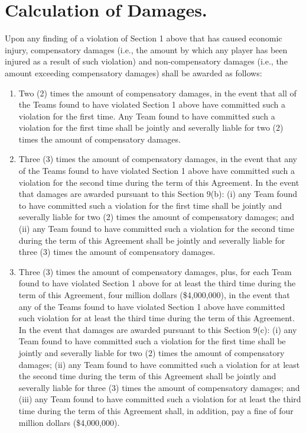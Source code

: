 \documentclass[
]{book}
\providecommand{\tightlist}{%
  \setlength{\itemsep}{0pt}\setlength{\parskip}{0pt}}
\begin{document}
\hypertarget{calculation-of-damages.}{%
\section{Calculation of Damages.}\label{calculation-of-damages.}}

Upon any finding of a violation of Section 1 above that has caused economic injury, compensatory damages (i.e., the amount by which any player has been injured as a result of such violation) and non-compensatory damages (i.e., the amount exceeding compensatory damages) shall be awarded as follows:

\begin{enumerate}
\def\labelenumi{(\alph{enumi})}
\tightlist
\item
  Two (2) times the amount of compensatory damages, in the event that all of the Teams found to have violated Section 1 above have committed such a violation for the first time. Any Team found to have committed such a violation for the first time shall be jointly and severally liable for two (2) times the amount of compensatory damages.
\item
  Three (3) times the amount of compensatory damages, in the event that any of the Teams found to have violated Section 1 above have committed such a violation for the second time during the term of this Agreement. In the event that damages are awarded pursuant to this Section 9(b): (i) any Team found to have committed such a violation for the first time shall be jointly and severally liable for two (2) times the amount of compensatory damages; and (ii) any Team found to have committed such a violation for the second time during the term of this Agreement shall be jointly and severally liable for three (3) times the amount of compensatory damages.
\item
  Three (3) times the amount of compensatory damages, plus, for each Team found to have violated Section 1 above for at least the third time during the term of this Agreement, four million dollars (\$4,000,000), in the event that any of the Teams found to have violated Section 1 above have committed such violation for at least the third time during the term of this Agreement. In the event that damages are awarded pursuant to this Section 9(c): (i) any Team found to have committed such a violation for the first time shall be jointly and severally liable for two (2) times the amount of compensatory damages; (ii) any Team found to have committed such a violation for at least the second time during the term of this Agreement shall be jointly and severally liable for three (3) times the amount of compensatory damages; and (iii) any Team found to have committed such a violation for at least the third time during the term of this Agreement shall, in addition, pay a fine of four million dollars (\$4,000,000).
\end{enumerate}
\end{document}
